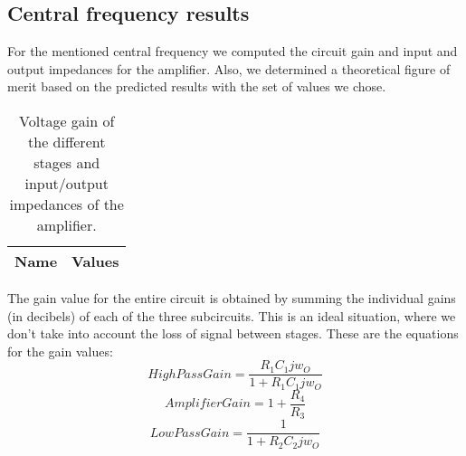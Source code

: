 \subsection{Central frequency results}
For the mentioned central frequency we computed the circuit gain and input and output impedances for the amplifier. Also, we determined a theoretical figure of merit based on the predicted results with the set of values we chose.
\begin{table}[h!]
  \centering
  \begin{tabular}{|l|r|}
    \hline    
    {\bf Name} & {\bf Values} \\ \hline
     
  \end{tabular}
  \caption{Voltage gain of the different stages and input/output impedances of the amplifier.}
  \label{tab:data}
\end{table}
The gain value for the entire circuit is obtained by summing the individual gains (in decibels) of each of the three subcircuits. This is an ideal situation, where we don't take into account the loss of signal between stages.
These are the equations for the gain values:
\begin{equation}
High Pass Gain=\frac{R_{1}C_{1}jw_{O}}{1+R_{1}C_{1}jw_{O}}
\end{equation}
\begin{equation}
Amplifier Gain=1+\frac{R_{4}}{R_{3}}
\end{equation}
\begin{equation}
Low Pass Gain=\frac{1}{1+R_{2}C_{2}jw_{O}}
\end{equation}
